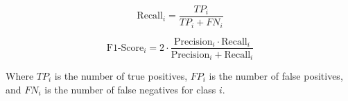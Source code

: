 \documentclass[a4paper]{article}
\theoremstyle{plain}
\theoremstyle{definition}
\begin{document}
\begin{equation}
    \text{Recall}_i = \frac{TP_i}{TP_i + FN_i}
\end{equation}

\begin{equation}
    \text{F1-Score}_i = 2 \cdot \frac{\text{Precision}_i \cdot \text{Recall}_i}{\text{Precision}_i + \text{Recall}_i}
\end{equation}

Where \( TP_i \) is the number of true positives, \( FP_i \) is the number of false positives, and \( FN_i \) is the number of false negatives for class \( i \).


	
	




\end{document}
